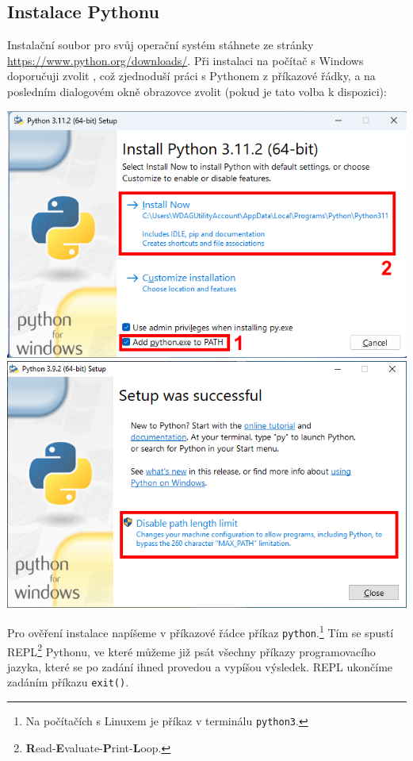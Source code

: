 \documentclass[a4paper,11pt,twoside]{article}
\def\code#1{\textnormal{\texttt{#1}}}
\def\abbreviation#1{\textnormal{\textsc{#1}}}
\theoremstyle{red}
\theoremstyle{green}
\begin{document}
\subsection{Instalace Pythonu}
\label{sec:InstalacePython}
    Instalační soubor pro svůj operační systém stáhnete ze stránky \url{https://www.python.org/downloads/}.
    Při instalaci na počítač s Windows doporučuji zvolit , což zjednoduší práci s Pythonem z příkazové řádky, a na posledním dialogovém okně obrazovce zvolit  (pokud je tato volba k dispozici):
    \begin{center}
        \includegraphics[width=0.495\linewidth]{PythonInstallPath.png}
        \includegraphics[width=0.495\linewidth]{PythonInstallPathLimit.png}
    \end{center}
    Pro ověření instalace napíšeme v příkazové řádce příkaz \code{python}.\footnote{Na počítačích s Linuxem je příkaz v terminálu \code{python3}.}
    Tím se spustí \abbreviation{REPL}\footnote{{\bf R}ead-{\bf E}valuate-{\bf P}rint-{\bf L}oop.} Pythonu, ve které můžeme již psát všechny příkazy programovacího jazyka, které se po zadání ihned provedou a vypíšou výsledek.
    REPL ukončíme zadáním příkazu \code{exit()}.
\end{document}

